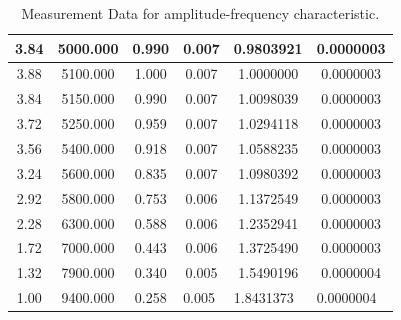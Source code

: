 \documentclass[a4paper,12pt]{article}
\begin{document}
\begin{table}[p]
\begin{center}
\begin{tabular}{|c|c|c|c|c|c|}
\multicolumn{1}{|c|}{3.84} & \multicolumn{1}{c|}{5000.000} & \multicolumn{1}{c|}{0.990} & \multicolumn{1}{l|}{0.007} & \multicolumn{1}{l|}{0.9803921} & \multicolumn{1}{l|}{0.0000003} \\ \hline
3.88                       & 5100.000                      & 1.000                      & 0.007                      & 1.0000000                      & 0.0000003                      \\ \hline
3.84                       & 5150.000                      & 0.990                      & 0.007                      & 1.0098039                      & 0.0000003                      \\ \hline
3.72                       & 5250.000                      & 0.959                      & 0.007                      & 1.0294118                      & 0.0000003                      \\ \hline
3.56                       & 5400.000                      & 0.918                      & 0.007                      & 1.0588235                      & 0.0000003                      \\ \hline
3.24                       & 5600.000                      & 0.835                      & 0.007                      & 1.0980392                      & 0.0000003                      \\ \hline
2.92                       & 5800.000                      & 0.753                      & 0.006                      & 1.1372549                      & 0.0000003                      \\ \hline
2.28                       & 6300.000                      & 0.588                      & 0.006                      & 1.2352941                      & 0.0000003                      \\ \hline
1.72                       & 7000.000                      & 0.443                      & 0.006                      & 1.3725490                      & 0.0000003                      \\ \hline
1.32                       & 7900.000                      & 0.340                      & 0.005                      & 1.5490196                      & 0.0000004                      \\ \hline
\multicolumn{1}{|c|}{1.00} & \multicolumn{1}{c|}{9400.000} & \multicolumn{1}{c|}{0.258} & \multicolumn{1}{l|}{0.005} & \multicolumn{1}{l|}{1.8431373} & \multicolumn{1}{l|}{0.0000004} \\ \hline
\end{tabular}
\caption{Measurement Data for amplitude-frequency characteristic.}
\end{center}
\end{table}
\end{document}
